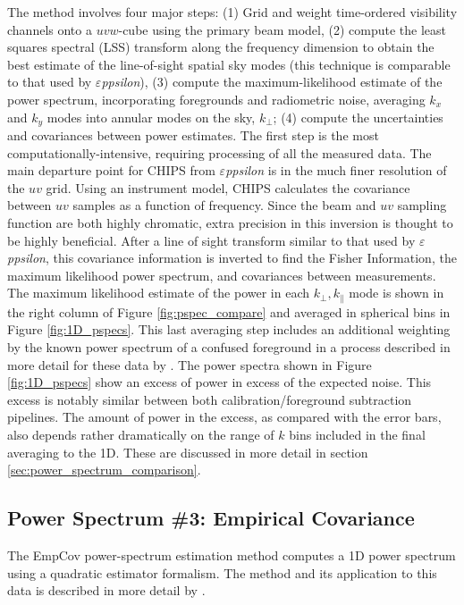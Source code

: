 \documentclass[twolcolumn,iop]{emulateapj}
\def\eppsilon{{\it $\varepsilon$ppsilon}}
\def\empirical{EmpCov}
\def\chipscite{\cite{2016arXiv160102073T}}
\def\dilloncite{\cite{PhysRevD.91.123011} }
\begin{document}
The method involves four major steps: (1) Grid and weight time-ordered visibility channels onto a $uvw$-cube using the primary beam model, (2) compute the least squares spectral (LSS) transform along the frequency dimension to obtain the best estimate of the line-of-sight spatial sky modes (this technique is comparable to that used by \eppsilon), (3) compute the maximum-likelihood estimate of the power spectrum, incorporating foregrounds and radiometric noise,  averaging $k_x$ and $k_y$ modes into annular modes on the sky, $k_\bot$; (4) compute the uncertainties and covariances between power estimates. The first step is the most computationally-intensive, requiring processing of all the measured data. The main departure point for CHIPS from \eppsilon{} is in the much finer resolution of the $uv$ grid.  Using an instrument model, CHIPS calculates the covariance between $uv$ samples as a function of frequency.  Since the beam and $uv$ sampling function are both highly chromatic, extra precision in this inversion is thought to be highly beneficial. After a line of sight transform similar to that used by \eppsilon{}, this covariance information is inverted to find the Fisher Information, the maximum likelihood power spectrum, and covariances between measurements.  The maximum likelihood estimate of the power in each $k_\bot,k_\parallel$ mode is shown in the right column of Figure \ref{fig:pspec_compare} and averaged in spherical bins in Figure \ref{fig:1D_pspecs}. This last averaging step includes an additional weighting by the known power spectrum of a confused foreground in a process described in more detail for these data by \chipscite{}. The power spectra shown in Figure \ref{fig:1D_pspecs} show an excess of power in excess of the expected noise. This excess is notably similar between both calibration/foreground subtraction pipelines. The amount of power in the excess, as compared with the error bars, also depends rather dramatically on the range of $k$ bins included in the final averaging to the 1D.  These are discussed in more detail in section \ref{sec:power_spectrum_comparison}.

\subsection{Power Spectrum \#3: Empirical Covariance}
\label{sec:empirical_cov}

The \empirical{} power-spectrum estimation method computes a 1D power spectrum using a quadratic estimator formalism. The method and its application to this data is described in more detail by \dilloncite{}.
\end{document}
